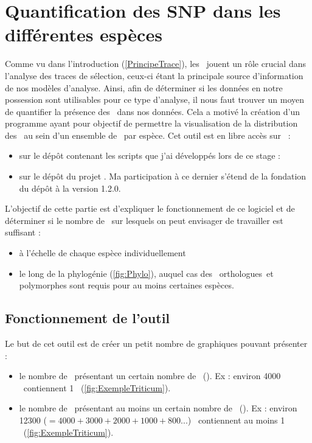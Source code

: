 \documentclass[../main]{subfiles} %
\begin{document}
\addto\extrasfrench{\protected\edef:{\unexpanded\expandafter{:}}}


\section{Quantification des SNP dans les différentes espèces}
\label{sec:SnpHeatmap}
Comme vu dans l'introduction (\cref{PrincipeTrace}), les \SNP jouent un rôle crucial dans l'analyse des traces de sélection, ceux-ci étant la principale source d'information de nos modèles d'analyse. Ainsi, afin de déterminer si les données en notre possession sont utilisables pour ce type d’analyse, il nous faut trouver un moyen de quantifier la présence des \SNP dans nos données. Cela a motivé la création d’un programme ayant pour objectif de permettre la visualisation de la distribution des \SNP au sein d’un ensemble de \contigs par espèce. Cet outil est en libre accès sur \GitHub :
\begin{itemize}
    \item sur le dépôt contenant les scripts que j'ai développés lors de ce stage : \cite{internship2024}
    \item sur le dépôt du projet \cite{snpheatmap}. Ma participation à ce dernier s'étend de la fondation du dépôt à la version 1.2.0.
\end{itemize}

L'objectif de cette partie est d'expliquer le fonctionnement de ce logiciel et de déterminer si le nombre de \contigs sur lesquels on peut envisager de travailler est suffisant :
\begin{itemize}
    \item à l’échelle de chaque espèce individuellement
    \item le long de la phylogénie (\cref{fig:Phylo}), auquel cas des \contigs \glspl{orthologue} et polymorphes sont requis pour au moins certaines espèces.  
\end{itemize}


\subsection{Fonctionnement de l’outil} 
\label{sec:FonctionnementSNPHeatmap}
Le but de cet outil est de créer un petit nombre de graphiques pouvant présenter :

\begin{itemize}
    \item le nombre de \contigs présentant un certain nombre de \SNP (\GNSPeq). Ex : environ 
    \num{4000}
    \contigs contiennent 1 \SNP (\cref{fig:ExempleTriticum}).
    
    \item le  nombre de \contigs présentant au moins un certain nombre de \SNP (\GNSPge). Ex : environ \num{12 300} ($= \num{4 000} + \num{3 000} + \num{2 000} + \num{1 000} + \num{800} ...$) \contigs contiennent au moins 1 \SNP (\cref{fig:ExempleTriticum}). 
\end{itemize}
\end{document}
